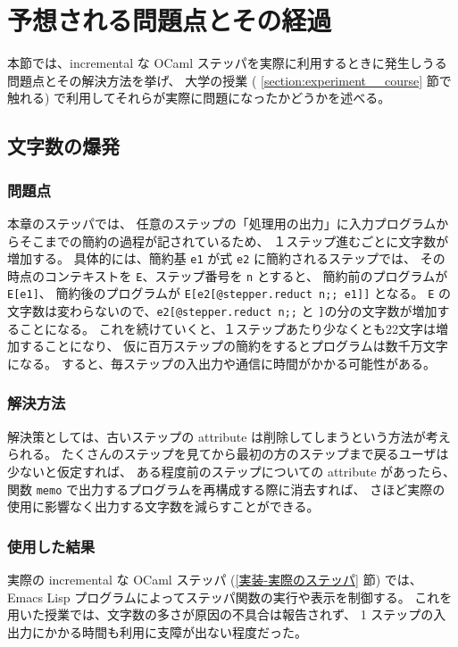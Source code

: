 \section{予想される問題点とその経過}
本節では、incremental な OCaml ステッパを実際に利用するときに発生しうる問題点とその解決方法を挙げ、
大学の授業 ( \ref{section:experiment__course} 節で触れる) で利用してそれらが実際に問題になったかどうかを述べる。

\subsection{文字数の爆発}
\label{予想される問題点-文字数の爆発}

\subsubsection{問題点}

本章のステッパでは、
任意のステップの「処理用の出力」に入力プログラムからそこまでの簡約の過程が記されているため、
１ステップ進むごとに文字数が増加する。
具体的には、簡約基 \texttt{e1} が式 \texttt{e2} に簡約されるステップでは、
その時点のコンテキストを \texttt{E}、ステップ番号を \texttt{n} とすると、
簡約前のプログラムが \texttt{E[e1]}、
簡約後のプログラムが \texttt{E[e2[@stepper.reduct n;; e1]]} となる。
\texttt{E} の文字数は変わらないので、\texttt{e2[@stepper.reduct n;;}
と \texttt{]}の分の文字数が増加することになる。
これを続けていくと、１ステップあたり少なくとも22文字は増加することになり、
仮に百万ステップの簡約をするとプログラムは数千万文字になる。
すると、毎ステップの入出力や通信に時間がかかる可能性がある。

\subsubsection{解決方法}

解決策としては、古いステップの attribute は削除してしまうという方法が考えられる。
たくさんのステップを見てから最初の方のステップまで戻るユーザは少ないと仮定すれば、
ある程度前のステップについての attribute があったら、
関数 \texttt{memo} で出力するプログラムを再構成する際に消去すれば、
さほど実際の使用に影響なく出力する文字数を減らすことができる。

\subsubsection{使用した結果}

実際の incremental な OCaml ステッパ (\ref{実装-実際のステッパ} 節) では、
Emacs Lisp プログラムによってステッパ関数の実行や表示を制御する。
これを用いた授業では、文字数の多さが原因の不具合は報告されず、
1 ステップの入出力にかかる時間も利用に支障が出ない程度だった。

